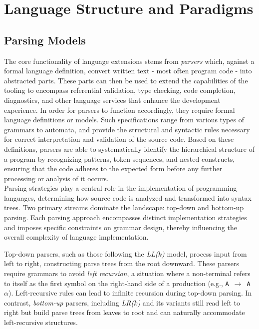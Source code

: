 \section{Language Structure and Paradigms}

\subsection{Parsing Models}
\label{sec:parser}

The core functionality of language extensions stems from \textit{parsers} which, against a formal language
definition, convert written text - most often program code - into abstracted parts. These parts can then be used to extend the capabilities of the
tooling to encompass referential validation, type checking, code completion, diagnostics, and other language services that enhance the development experience.
In order for parsers to function accordingly, they require formal language definitions or models. Such specifications range from various types of grammars to
automata, and provide the structural and syntactic rules necessary for correct interpretation and validation of the source code.
Based on these definitions, parsers are able to systematically identify the hierarchical structure of a program by recognizing patterns, token sequences, and nested
constructs, ensuring that the code adheres to the expected form before any further processing or analysis of it occurs.
\\

Parsing strategies play a central role in the implementation of programming languages, determining how source code is analyzed and transformed into syntax trees.
Two primary streams dominate the landscape: top-down and bottom-up parsing. Each parsing approach encompasses distinct implementation strategies and imposes specific
constraints on grammar design, thereby influencing the overall complexity of language implementation.

Top-down parsers, such as those following the \textit{LL($k$)} model, process input from left to right, constructing parse trees from the root downward.
These parsers require grammars to avoid \textit{left recursion}, a situation where a non-terminal refers to itself as the first symbol on the right-hand side of a
production (e.g., \texttt{A}~$\rightarrow$~\texttt{A}~$\alpha$). Left-recursive rules can lead to infinite recursion during top-down parsing.
In contrast, \textit{bottom-up} parsers, including \textit{LR($k$)} and its variants still read left to right but build parse trees from leaves to root and can naturally accommodate
left-recursive structures.

